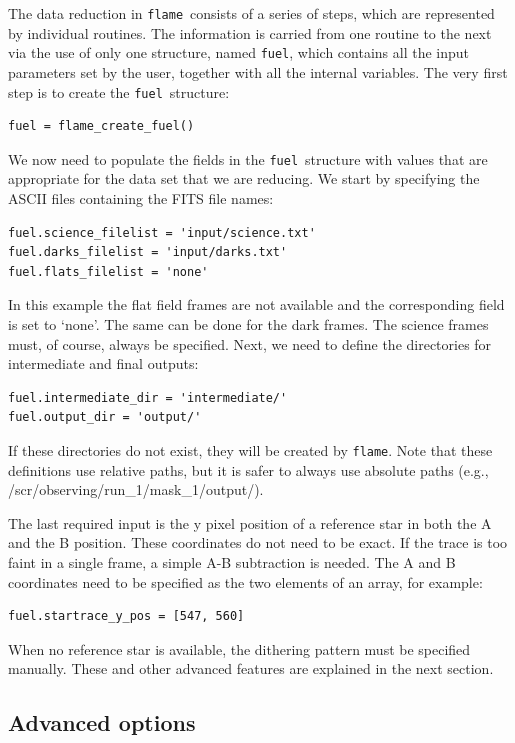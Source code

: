 \documentclass[a4paper, notitlepage]{article}
\newcommand{\flame}{\texttt{flame}}
\newcommand{\fuel}{\texttt{fuel}}
\begin{document}
The data reduction in \flame\ consists of a series of steps, which are represented by individual routines. The information is carried from one routine to the next via the use of only one structure, named \fuel, which contains all the input parameters set by the user, together with all the internal variables. The very first step is to create the \fuel\ structure:
\begin{lstlisting}
fuel = flame_create_fuel()
\end{lstlisting}
We now need to populate the fields in the \fuel\ structure with values that are appropriate for the data set that we are reducing.
We start by specifying the ASCII files containing the FITS file names:
\begin{lstlisting}
fuel.science_filelist = 'input/science.txt'
fuel.darks_filelist = 'input/darks.txt'
fuel.flats_filelist = 'none'
\end{lstlisting}
In this example the flat field frames are not available and the corresponding field is set to \textquoteleft none\textquoteright. The same can be done for the dark frames. The science frames must, of course, always be specified.
Next, we need to define the directories for intermediate and final outputs:
\begin{lstlisting}
fuel.intermediate_dir = 'intermediate/'
fuel.output_dir = 'output/'
\end{lstlisting}
If these directories do not exist, they will be created by \flame. Note that these definitions use relative paths, but it is safer to always use absolute paths (e.g., /scr/observing/run\_1/mask\_1/output/).

The last required input is the y pixel position of a reference star in both the A and the B position. These coordinates do not need to be exact. If the trace is too faint in a single frame, a simple A-B subtraction is needed. The A and B coordinates need to be specified as the two elements of an array, for example:
\begin{lstlisting}
fuel.startrace_y_pos = [547, 560]
\end{lstlisting}
When no reference star is available, the dithering pattern must be specified manually. These and other advanced features are explained in the next section.



\subsection{Advanced options}
\end{document}
